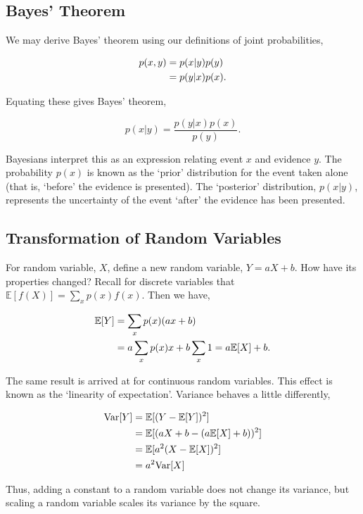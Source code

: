 \documentclass[11pt]{amsart}
\begin{document}
\subsection{Bayes' Theorem}

We may derive Bayes' theorem using our definitions of joint probabilities,

\begin{align}
p(x, y) &= p(x | y)p(y) \notag \\
&= p(y | x)p(x). \notag
\end{align}

Equating these gives Bayes' theorem,

$$p(x | y) = \frac{p(y | x)p(x)}{p(y)}.$$

Bayesians interpret this as an expression relating event $x$ and evidence $y$. The probability $p(x)$ is known as the `prior' distribution for the event taken alone (that is, `before' the evidence is presented). The `posterior' distribution, $p(x | y)$, represents the uncertainty of the event `after' the evidence has been presented.

\subsection{Transformation of Random Variables}

For random variable, $X$, define a new random variable, $Y = aX + b$. How have its properties changed? Recall for discrete variables that $\mathbb{E}[f(X)] = \sum_x p(x)f(x)$. Then we have,

\begin{align}
\mathbb{E}[Y] &= \sum_x p(x)(ax + b) \notag \\
&= a\sum_x p(x)x + b\sum_x 1 = a\mathbb{E}[X] + b. \notag
\end{align}

The same result is arrived at for continuous random variables. This effect is known as the `linearity of expectation'. Variance behaves a little differently,

\begin{align}
\text{Var}[Y] &= \mathbb{E}[(Y - \mathbb{E}[Y])^2] \notag \\
&= \mathbb{E}[(aX + b - (a\mathbb{E}[X] + b))^2] \notag \\
&= \mathbb{E}[a^2(X  - \mathbb{E}[X])^2] \notag \\
&= a^2\text{Var}[X] \notag
\end{align}

Thus, adding a constant to a random variable does not change its variance, but scaling a random variable scales its variance by the square.
\end{document}
